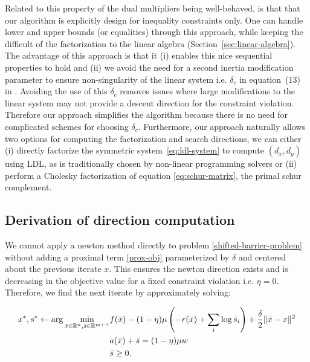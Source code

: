 \documentclass{article}
\begin{document}
Related to this property of the dual multipliers being well-behaved, is that that our algorithm is explicitly design for inequality constraints only. One can handle lower and upper bounds (or equalities) through this approach, while keeping the difficult of the factorization to the linear algebra  (Section~\ref{sec:linear-algebra}). The advantage of this approach is that it (i) enables this nice sequential properties to hold and (ii) we avoid the need for a second inertia modification parameter to ensure non-singularity of the linear system i.e. $\delta_{c}$ in equation~(13) in \cite{wachter2006implementation}. Avoiding the use of this $\delta_{c}$ removes issues where large modifications to the linear system may not provide a descent direction for the constraint violation. Therefore our approach simplifies the algorithm because there is no need for complicated schemes for choosing $\delta_{c}$. Furthermore, our approach naturally allows two options for computing the factorization and search directions, we can either (i) directly factorize the symmetric system~\eqref{eq:ldl-system} to compute $(d_{x},d_{y})$ using LDL, as is traditionally chosen by non-linear programming solvers or (ii) perform a Cholesky factorization of equation \eqref{eq:schur-matrix}, the primal schur complement. 


\subsection{Derivation of direction computation}\label{sub:direction-computation}

We cannot apply a newton method directly to problem \eqref{shifted-barrier-problem} without adding a proximal term \eqref{prox-obj} parameterized by $\delta$ and centered about the previous iterate $x$. This ensures the newton direction exists and is decreasing in the objective value for a fixed constraint violation i.e. $\eta = 0$. Therefore, we find the next iterate by approximately solving:

\begin{subequations}\label{sophisticated-barrier-problem}
\begin{flalign}
x^{*}, s^{*} \gets \arg \min_{\bar{x} \in \mathbb{R}^{n}, \bar{s} \in \mathbb{R}^{m++}} & f(\bar{x}) -(1 - \eta) \mu \left( -r( \bar{x} ) + \sum_i{ \log{\bar{s}_i} } \right)  + \frac{\delta}{2} \| \bar{x} - x \|^2 \label{prox-obj} \\
& a(\bar{x}) + \bar{s} = (1 - \eta) \mu w \\
& \bar{s} \ge 0.
\end{flalign}
\end{subequations}
\end{document}
